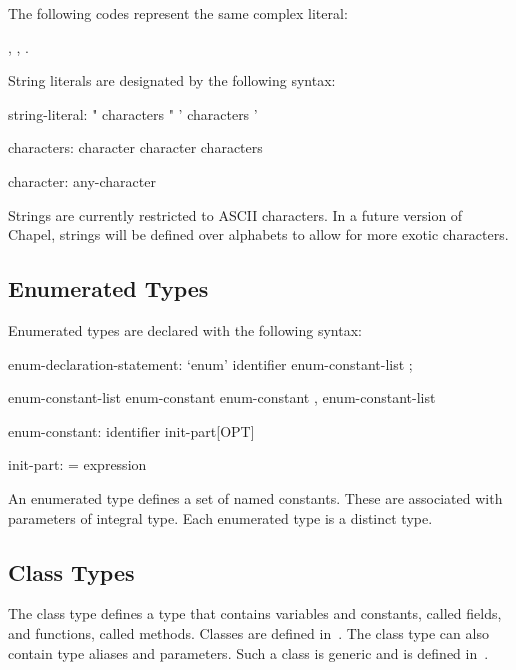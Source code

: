 \begin{example}
The following codes represent the same complex literal:
\begin{center}
, \hspace{1pc} , \hspace{1pc}
.
\end{center}
\end{example}

String literals are designated by the following syntax:
\begin{syntax}
string-literal:
  " characters "
  ' characters '

characters:
  character
  character characters

character:
  any-character
\end{syntax}

\begin{implementation}
Strings are currently restricted to ASCII characters.  In a future
version of Chapel, strings will be defined over alphabets to allow for
more exotic characters.
\end{implementation}

\subsection{Enumerated Types}
\label{Enumerated_Types}

Enumerated types are declared with the following syntax:
\begin{syntax}
enum-declaration-statement:
  `enum' identifier { enum-constant-list } ;

enum-constant-list
  enum-constant
  enum-constant , enum-constant-list

enum-constant:
  identifier init-part[OPT]

init-part:
  = expression
\end{syntax}

An enumerated type defines a set of named constants.  These are
associated with parameters of integral type.  Each enumerated type is
a distinct type.

\subsection{Class Types}
\label{Class_Types}

The class type defines a type that contains variables and constants,
called fields, and functions, called methods.  Classes are defined
in~.  The class type can also contain type aliases and
parameters.  Such a class is generic and is defined
in~.


